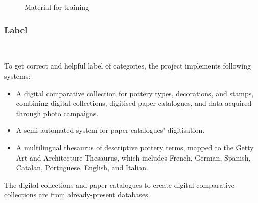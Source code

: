 \documentclass[journal]{IEEEtran}
\begin{document}
	\begin{figure}[htbp]%
		\centering
		\hfill
		\caption{Material for training}
		\label{2figs}
	\end{figure}
	
	\subsubsection{Label}
	\ 
	
	To get correct and helpful label of categories, the project implements following systems:
	
	\begin{itemize}
		\item A digital comparative collection for pottery types, decorations, and stamps, combining digital collections, digitised paper catalogues, and data acquired through photo campaigns.
		\item A semi-automated system for paper catalogues’ digitisation.
		\item A multilingual thesaurus of descriptive pottery terms, mapped to the Getty Art and Architecture Thesaurus, which includes French, German, Spanish, Catalan, Portuguese, English, and Italian.		
	\end{itemize}
	
	The digital collections and paper catalogues to create digital comparative collections are from already-present databases. 
	
\end{document}
